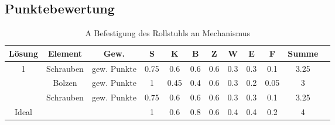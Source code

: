 \documentclass[10pt,a4paper]{article}
\begin{document}
\subsection{Punktebewertung}
\begin{table}[h]
    \centering
    \begin{tabular}{cccccccccccc}
        \toprule
        \textbf{Lösung} & \textbf{Element} & \textbf{Gew.} & \textbf{S} & \textbf{K} & \textbf{B} & \textbf{Z} & \textbf{W} & \textbf{E} & \textbf{F} & \textbf{Summe} & \\
        \midrule
        1               & Schrauben        & gew. Punkte   & 0.75       & 0.6        & 0.6        & 0.6        & 0.3        & 0.3        & 0.1        & 3.25             \\
        \addlinespace
        2               & Bolzen           & gew. Punkte   & 1          & 0.45       & 0.4        & 0.6        & 0.3        & 0.2        & 0.05       & 3                \\
        \addlinespace
        3               & Schrauben        & gew. Punkte   & 0.75       & 0.6        & 0.6        & 0.6        & 0.3        & 0.3        & 0.1        & 3.25             \\
        \midrule
        Ideal           &                  &               & 1          & 0.6        & 0.8        & 0.6        & 0.4        & 0.4        & 0.2        & 4                \\
        \bottomrule
    \end{tabular}
    \caption{A Befestigung des Rollstuhls an Mechanismus}
    \label{tab:befestigung}
\end{table}
\end{document}
